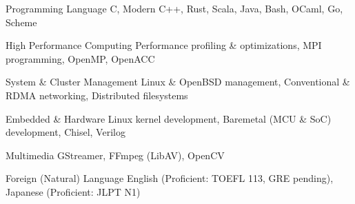 

\begin{cvskills}

  \cvskill
    {Programming Language} %
    {C, Modern C++, Rust, Scala, Java, Bash, OCaml, Go, Scheme} %

  \cvskill
    {High Performance Computing} %
    {Performance profiling \& optimizations, MPI programming, OpenMP, OpenACC} %

  \cvskill
    {System \& Cluster Management} %
    {Linux \& OpenBSD management, Conventional \& RDMA networking, Distributed filesystems} %

  \cvskill
    {Embedded \& Hardware}
    {Linux kernel development, Baremetal (MCU \& SoC) development, Chisel, Verilog}

  \cvskill
    {Multimedia}
    {GStreamer, FFmpeg (LibAV), OpenCV}

  \cvskill
    {Foreign (Natural) Language} %
    {English (Proficient: TOEFL 113, GRE pending), Japanese (Proficient: JLPT N1)} %

\end{cvskills}
